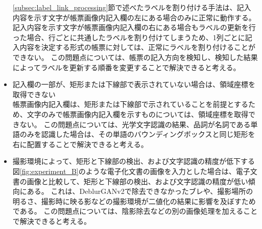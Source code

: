 \begin{itemize}
        \ref{subsec:label_link_processing}節で述べたラベルを割り付ける手法は、記入内容を示す文字が帳票画像内記入欄の左にある場合のみに正常に動作する。
        記入内容を示す文字が帳票画像内記入欄の右にある場合もラベルの更新を行った場合、行ごとに共通したラベルを割り付けてしまうため、1列ごとに記入内容を決定する形式の帳票に対しては、正常にラベルを割り付けることができない。
        この問題点については、帳票の記入方向を検知し、検知した結果によってラベルを更新する順番を変更することで解決できると考える。
    \item 記入欄の一部が、矩形または下線部で表示されていない場合は、領域座標を取得できない\\
        帳票画像内記入欄は、矩形または下線部で示されていることを前提とするため、文字のみで帳票画像内記入欄を示すものについては、領域座標を取得できない。
        この問題点については、光学文字認識の結果、品詞が名詞である単語のみを認識した場合は、その単語のバウンディングボックスと同じ矩形を右に配置することで解決できると考える。
    \item 撮影環境によって、矩形と下線部の検出、および文字認識の精度が低下する\\
        図\ref{fig:experiment_B}のような電子化文書の画像を入力とした場合は、電子文書の画像と比較して、矩形と下線部の検出、および文字認識の精度が低い傾向にある。
        これは、DeblurGANv2で除去できなかったブレや、撮影場所の明るさ、撮影時に映る影などの撮影環境が二値化の結果に影響を及ぼすためである。
        この問題点については、陰影除去などの別の画像処理を加えることで解決できると考える。
\end{itemize}
